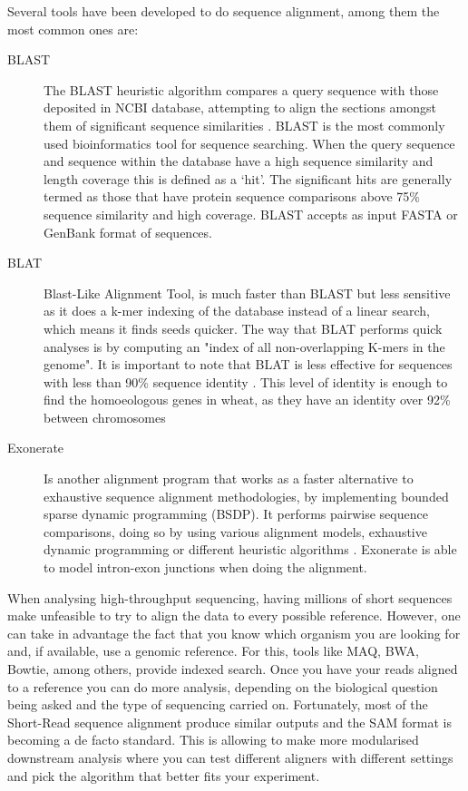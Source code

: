 Several tools have been developed to do sequence alignment, among them the most common ones are:

\begin{description}
\item[BLAST] The BLAST heuristic algorithm compares a query sequence with those deposited in NCBI database, attempting to align the sections amongst them of significant sequence similarities \citep{Altschul1990}. BLAST is the most commonly used bioinformatics tool for sequence searching. When the query sequence and sequence within the database have a high sequence similarity and length coverage this is defined as a ‘hit’. The significant hits are generally termed as those that have protein sequence comparisons above 75\% sequence similarity and high coverage. BLAST accepts as input FASTA  or GenBank format of sequences.
\item[BLAT] Blast-Like Alignment Tool, is much faster than BLAST but less sensitive as it does a k-mer indexing of the database instead of a linear search, which means it finds seeds quicker. The way that BLAT performs quick analyses is by computing an "index of all non-overlapping K-mers in the genome". It is important to note that BLAT is less effective for sequences with less than 90\% sequence identity \citep{Kent2002}. This level of identity is enough to find the homoeologous genes in wheat, as they have an identity over 92\% between chromosomes \citep{Krasileva2013}
\item[Exonerate] Is another alignment program that works as a faster alternative to exhaustive sequence alignment methodologies, by implementing bounded sparse dynamic programming (BSDP).  It performs pairwise sequence comparisons, doing so by using various alignment models, exhaustive dynamic programming or different heuristic algorithms \citep{Slater2005}.  Exonerate is able to model intron-exon junctions when doing the alignment. 
\end{description}


When analysing high-throughput sequencing, having millions of short sequences make unfeasible to try to align the data to every possible reference. However, one can take in advantage the fact that you know which organism you are looking for and, if available, use a genomic reference. For this, tools like MAQ, BWA, Bowtie, among others, provide indexed search.  Once you have your reads aligned to a reference you can do more analysis, depending on the biological question being asked and the type of sequencing carried on.  Fortunately, most of the Short-Read sequence alignment produce similar outputs and the SAM format is becoming a de facto standard. This is allowing to make more modularised downstream analysis where you can test different aligners with different settings and pick the algorithm that better fits your experiment\cite{Liu2012,Li2009,Li2009a}. 

